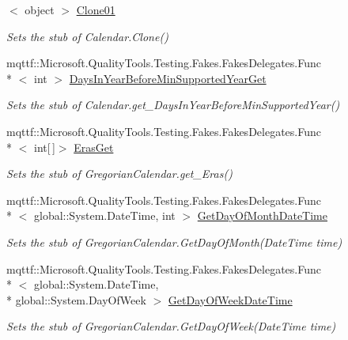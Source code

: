 \begin{DoxyCompactItemize}
$<$ object $>$ \hyperlink{class_system_1_1_globalization_1_1_fakes_1_1_stub_gregorian_calendar_a1459447edbc7826b2d9b5619197c4e45}{Clone01}
\begin{DoxyCompactList}\small\item\em Sets the stub of Calendar.\-Clone()\end{DoxyCompactList}\item 
mqttf\-::\-Microsoft.\-Quality\-Tools.\-Testing.\-Fakes.\-Fakes\-Delegates.\-Func\\*
$<$ int $>$ \hyperlink{class_system_1_1_globalization_1_1_fakes_1_1_stub_gregorian_calendar_aa325926bd113cf06bb4fe4c1fe69b064}{Days\-In\-Year\-Before\-Min\-Supported\-Year\-Get}
\begin{DoxyCompactList}\small\item\em Sets the stub of Calendar.\-get\-\_\-\-Days\-In\-Year\-Before\-Min\-Supported\-Year()\end{DoxyCompactList}\item 
mqttf\-::\-Microsoft.\-Quality\-Tools.\-Testing.\-Fakes.\-Fakes\-Delegates.\-Func\\*
$<$ int\mbox{[}$\,$\mbox{]}$>$ \hyperlink{class_system_1_1_globalization_1_1_fakes_1_1_stub_gregorian_calendar_a41cb6789d85a47a6150fc69192b14abf}{Eras\-Get}
\begin{DoxyCompactList}\small\item\em Sets the stub of Gregorian\-Calendar.\-get\-\_\-\-Eras()\end{DoxyCompactList}\item 
mqttf\-::\-Microsoft.\-Quality\-Tools.\-Testing.\-Fakes.\-Fakes\-Delegates.\-Func\\*
$<$ global\-::\-System.\-Date\-Time, int $>$ \hyperlink{class_system_1_1_globalization_1_1_fakes_1_1_stub_gregorian_calendar_a398b5c26aa3aefc2a3e85b232ffa4485}{Get\-Day\-Of\-Month\-Date\-Time}
\begin{DoxyCompactList}\small\item\em Sets the stub of Gregorian\-Calendar.\-Get\-Day\-Of\-Month(\-Date\-Time time)\end{DoxyCompactList}\item 
mqttf\-::\-Microsoft.\-Quality\-Tools.\-Testing.\-Fakes.\-Fakes\-Delegates.\-Func\\*
$<$ global\-::\-System.\-Date\-Time, \\*
global\-::\-System.\-Day\-Of\-Week $>$ \hyperlink{class_system_1_1_globalization_1_1_fakes_1_1_stub_gregorian_calendar_ab9f50745563340fda4199f2393fb62ea}{Get\-Day\-Of\-Week\-Date\-Time}
\begin{DoxyCompactList}\small\item\em Sets the stub of Gregorian\-Calendar.\-Get\-Day\-Of\-Week(\-Date\-Time time)\end{DoxyCompactList}\item 

\end{DoxyCompactItemize}
